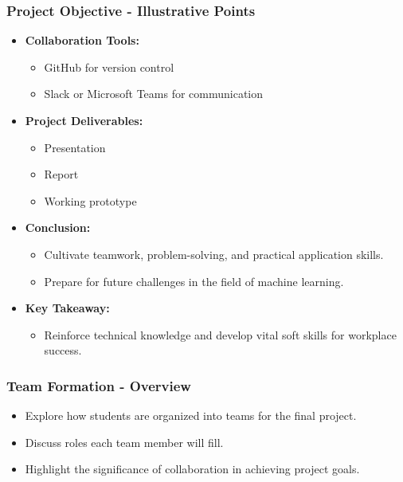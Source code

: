 \documentclass{beamer}
\begin{document}
\begin{frame}[fragile]
    \frametitle{Project Objective - Illustrative Points}
    \begin{itemize}
        \item \textbf{Collaboration Tools:}
            \begin{itemize}
                \item GitHub for version control 
                \item Slack or Microsoft Teams for communication
            \end{itemize}
        
        \item \textbf{Project Deliverables:}
            \begin{itemize}
                \item Presentation
                \item Report
                \item Working prototype
            \end{itemize}
        
        \item \textbf{Conclusion:}
            \begin{itemize}
                \item Cultivate teamwork, problem-solving, and practical application skills.
                \item Prepare for future challenges in the field of machine learning.
            \end{itemize}

        \item \textbf{Key Takeaway:} 
            \begin{itemize}
                \item Reinforce technical knowledge and develop vital soft skills for workplace success.
            \end{itemize}
    \end{itemize}
\end{frame}

\begin{frame}[fragile]
    \frametitle{Team Formation - Overview}
    \begin{itemize}
        \item Explore how students are organized into teams for the final project.
        \item Discuss roles each team member will fill.
        \item Highlight the significance of collaboration in achieving project goals.
    \end{itemize}
\end{frame}
\end{document}
